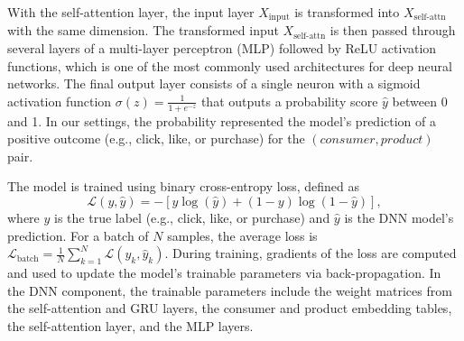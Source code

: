 With the self-attention layer, the input layer $X_{\text{input}}$ is transformed into $X_{\text{self-attn}}$ with the same dimension. The transformed input $X_{\text{self-attn}}$ is then passed through several layers of a multi-layer perceptron (MLP) followed by ReLU activation functions, which is one of the most commonly used architectures for deep neural networks. The final output layer consists of a single neuron with a sigmoid activation function $\sigma(z) = \frac{1}{1 + e^{-z}}$ that outputs a probability score $\hat{y}$ between 0 and 1. In our settings, the probability represented the model's prediction of a positive outcome (e.g., click, like, or purchase) for the $(consumer, product)$ pair.


The model is trained using binary cross-entropy loss, defined as 
\begin{equation}
\label{eq:cross_entropy_loss}
\mathcal{L}(y, \hat{y}) = -[y \log(\hat{y}) + (1 - y) \log(1 - \hat{y})],
\end{equation}
where \(y\) is the true label (e.g., click, like, or purchase) and $\hat{y}$ is the DNN model's prediction. For a batch of $N$ samples, the average loss is \(\mathcal{L}_{\text{batch}} = \frac{1}{N} \sum_{k=1}^{N} \mathcal{L}(y_k, \hat{y}_k)\). During training, gradients of the loss are computed and used to update the model's trainable parameters via back-propagation. In the DNN component, the trainable parameters include the weight matrices from the self-attention and GRU layers, the consumer and product embedding tables, the self-attention layer, and the MLP layers. 

